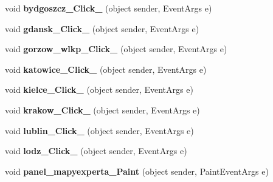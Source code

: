 \begin{DoxyCompactItemize}
\mbox{\label{class_pogodynka__w57003_1_1panel__glony_a548ec312f7b53b05c6f772495f043022}} 
void {\bfseries bydgoszcz\+\_\+\+Click\+\_} (object sender, Event\+Args e)
\item 
\mbox{\label{class_pogodynka__w57003_1_1panel__glony_a02669c1228d1c82352f1a3c512354eb2}} 
void {\bfseries gdansk\+\_\+\+Click\+\_} (object sender, Event\+Args e)
\item 
\mbox{\label{class_pogodynka__w57003_1_1panel__glony_a738d6c1be023e9404ab7e1a9158507a5}} 
void {\bfseries gorzow\+\_\+wlkp\+\_\+\+Click\+\_} (object sender, Event\+Args e)
\item 
\mbox{\label{class_pogodynka__w57003_1_1panel__glony_a64bd15aed857996f9a6bbd0fae4f3ab0}} 
void {\bfseries katowice\+\_\+\+Click\+\_} (object sender, Event\+Args e)
\item 
\mbox{\label{class_pogodynka__w57003_1_1panel__glony_a585bf9de909a3374009339c5edeaab15}} 
void {\bfseries kielce\+\_\+\+Click\+\_} (object sender, Event\+Args e)
\item 
\mbox{\label{class_pogodynka__w57003_1_1panel__glony_aada40ed519215c55fbb12b3be5a2ef49}} 
void {\bfseries krakow\+\_\+\+Click\+\_} (object sender, Event\+Args e)
\item 
\mbox{\label{class_pogodynka__w57003_1_1panel__glony_a53d5ff19d844dd236ce0ba69205e193d}} 
void {\bfseries lublin\+\_\+\+Click\+\_} (object sender, Event\+Args e)
\item 
\mbox{\label{class_pogodynka__w57003_1_1panel__glony_a566f50415d7a7575e91e669b8ba1bd0a}} 
void {\bfseries lodz\+\_\+\+Click\+\_} (object sender, Event\+Args e)
\item 
\mbox{\label{class_pogodynka__w57003_1_1panel__glony_afa95f5557b54d6cd6b275b5e3fd7cb3a}} 
void {\bfseries panel\+\_\+mapyexperta\+\_\+\+Paint} (object sender, Paint\+Event\+Args e)

\end{DoxyCompactItemize}

